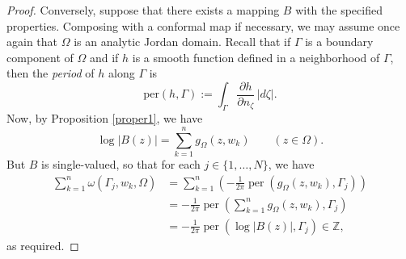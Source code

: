 \documentclass[10pt,a4paper]{amsart}
\begin{document}
\begin{proof}
Conversely, suppose that there exists a mapping $B$ with the specified properties. Composing with a conformal map if necessary, we may assume once again that $\Omega$ is an analytic Jordan domain. Recall that if $\Gamma$ is a boundary component of $\Omega$ and if $h$ is a smooth function defined in a neighborhood of $\Gamma$, then the \textit{period} of $h$ along $\Gamma$ is
$$
\mathrm{per} (h , \Gamma ) := \int_{\Gamma} \frac{\partial h}{\partial n_\zeta}\, |d\zeta| .
$$
Now, by Proposition \ref{proper1}, we have
$$
\log{|B(z)|} = \sum_{k=1}^n g_{\Omega}(z,w_k) \qquad (z \in \Omega).
$$
But $B$ is single-valued, so that for each $j \in \{1, \dots, N\}$, we have
\begin{align*}
\sum_{k=1}^n \omega(\Gamma_j,w_k,\Omega) &= \sum_{k=1}^n \left(- \frac{1}{2\pi} \operatorname{per}(g_{\Omega}(z,w_k), \Gamma_j)\right)\\
&= - \frac{1}{2\pi} \operatorname{per}\left(\sum_{k=1}^n g_{\Omega}(z,w_k), \Gamma_j\right)\\
&= - \frac{1}{2\pi} \operatorname{per}(\log{|B(z)|}, \Gamma_j) \in \mathbb{Z},
\end{align*}
as required.
\end{proof}
\end{document}
